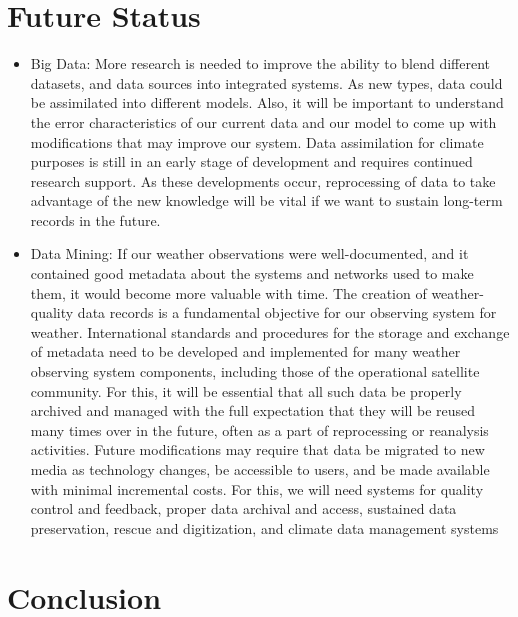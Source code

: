\documentclass{sig-alternate}
\begin{document}
\section{Future Status}
	\label{Future status}
	\begin{itemize}
		\item[] Big Data:\newline
			More research is needed to improve the ability to blend different datasets, and data sources 			into integrated systems. As new types, data could be assimilated into different models. 					Also, it will be important to understand the error characteristics of our current data and 				our model to come up with modifications that may improve our system. Data assimilation for 				climate purposes is still in an early stage of development and requires continued research 				support. As these developments occur, reprocessing of data to take advantage of the new 					knowledge will be vital if we want to sustain long-term records in the future.\newline
		
		\item[] Data Mining:\newline
			If our weather observations were well-documented, and it contained good metadata about the 				systems and networks used to make them, it would become more valuable with time. The 						creation of weather-quality data records is a fundamental objective for our observing system 			for weather. International standards and procedures for the storage and exchange of metadata 			need to be developed and implemented for many weather observing system components, including 			those of the operational satellite community. For this, it will be essential that all such 				data be properly archived and managed with the full expectation that they will be reused 					many times over in the future, often as a part of reprocessing or reanalysis activities. 					Future modifications may require that data be migrated to new media as technology changes, 				be accessible to users, and be made available with minimal incremental costs. For this, we 				will need systems for quality control and feedback, proper data archival and access, 						sustained data preservation, rescue and digitization, and climate data management 						systems\newpage
			
	\end{itemize}

\section{Conclusion}
	\label{Conclusion}
	
\end{document}
